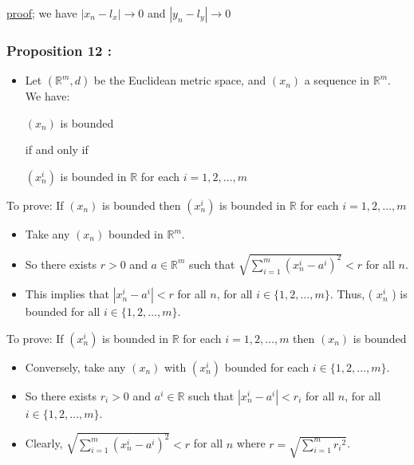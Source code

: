\documentclass[12pt,a4paper]{article}
\begin{document}
\underline{proof;} we have \(|x_{n} - l_{x}| \to 0\) and \(|y_{n} -l_{y}| \to 0\) 

 \subsubsection{Proposition 12 :} 
\begin{itemize}
    \item Let \(\left(\mathbb{R}^m, d\right)\) be the Euclidean metric space, and \(\left(x_n\right)\) a sequence in \(\mathbb{R}^m\). We have:
    
    \(\left(x_n\right)\) is bounded
    
    if and only if
    
    \(\left(x_n^i\right)\) is bounded in \(\mathbb{R}\) for each \(i=1,2, \ldots, m\)
\end{itemize}

To prove: If \(\left(x_n\right)\) is bounded then \(\left(x_n^i\right)\) is bounded in \(\mathbb{R}\) for each \(i=1,2, \ldots, m\)
\begin{itemize}
    \item Take any \(\left(x_n\right)\) bounded in \(\mathbb{R}^m\).
    \item So there exists \(r>0\) and \(a \in \mathbb{R}^m\) such that \(\sqrt{\sum_{i=1}^m\left(x_n^i-a^i\right)^2}<r\) for all \(n\).
    \item This implies that \(\left|x_n^i-a^i\right|<r\) for all \(n\), for all \(i \in\{1,2, \ldots, m\}\). Thus, ( \(x_n^i\) ) is bounded for all \(i \in\{1,2, \ldots, m\}\).
\end{itemize}
To prove: If \(\left(x_n^i\right)\) is bounded in \(\mathbb{R}\) for each \(i=1,2, \ldots, m\) then \(\left(x_n\right)\) is bounded
\begin{itemize}
    \item Conversely, take any \(\left(x_n\right)\) with \(\left(x_n^i\right)\) bounded for each \(i \in\{1,2, \ldots, m\}\).
    \item So there exists \(r_i>0\) and \(a^i \in \mathbb{R}\) such that \(\left|x_n^i-a^i\right|<r_i\) for all \(n\), for all \(i \in\{1,2, \ldots, m\}\).
    \item Clearly, \(\sqrt{\sum_{i=1}^m\left(x_n^i-a^i\right)^2}<r\) for all \(n\) where \(r=\sqrt{\sum_{i=1}^m r_i{ }^2}\).
\end{itemize}
\end{document}
